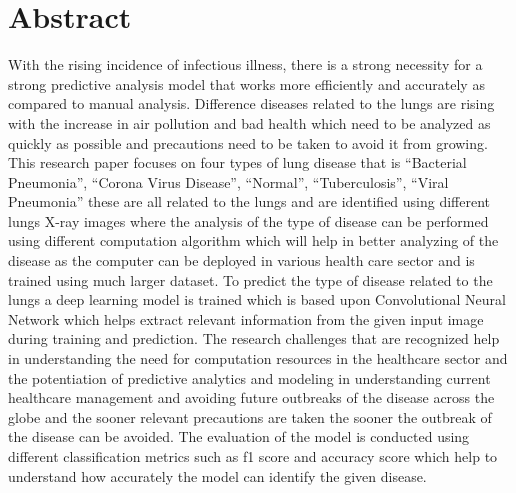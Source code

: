 \chapter*{\center \Large  Abstract}

With the rising incidence of infectious illness, there is a strong necessity for a strong predictive analysis model that works more efficiently and accurately as compared to manual analysis. Difference diseases related to the lungs are rising with the increase in air pollution and bad health which need to be analyzed as quickly as possible and precautions need to be taken to avoid it from growing. This research paper focuses on four types of lung disease that is “Bacterial Pneumonia”, “Corona Virus Disease”, “Normal”, “Tuberculosis”, “Viral Pneumonia” these are all related to the lungs and are identified using different lungs X-ray images where the analysis of the type of disease can be performed using different computation algorithm which will help in better analyzing of the disease as the computer can be deployed in various health care sector and is trained using much larger dataset. To predict the type of disease related to the lungs a deep learning model is trained which is based upon Convolutional Neural Network which helps extract relevant information from the given input image during training and prediction. The research challenges that are recognized help in understanding the need for computation resources in the healthcare sector and the potentiation of predictive analytics and modeling in understanding current healthcare management and avoiding future outbreaks of the disease across the globe and the sooner relevant precautions are taken the sooner the outbreak of the disease can be avoided. The evaluation of the model is conducted using different classification metrics such as f1 score and accuracy score which help to understand how accurately the model can identify the given disease. 

